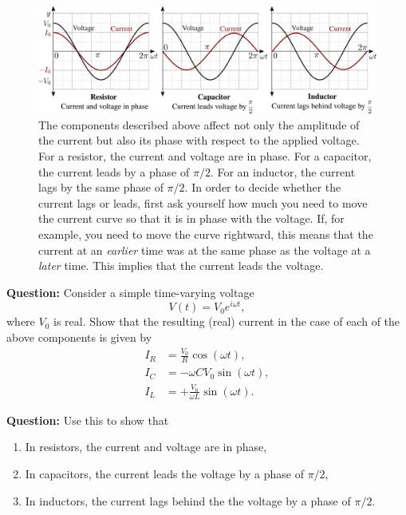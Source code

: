 \begin{figure}[!htb]
    \centering
    \includegraphics[width=\textwidth]{figs/electronics-circuits/electronics-components-phase-graphs.png}
    \caption{The components described above affect not only the amplitude of the current but also its phase with respect to the applied voltage. For a resistor, the current and voltage are in phase. For a capacitor, the current leads by a phase of $\pi/2$. For an inductor, the current lags by the same phase of $\pi/2$. In order to decide whether the current lags or leads, first ask yourself how much you need to move the current curve so that it is in phase with the voltage. If, for example, you need to move the curve rightward, this means that the current at an \textsl{earlier} time was at the same phase as the voltage at a \textsl{later} time. This implies that the current leads the voltage.  }
    \label{fig:phase-graphs}
\end{figure}



\begin{question}
    \textbf{Question:} Consider a simple time-varying voltage 
    \begin{equation}
        V(t) = V_0 e^{i\omega t},
    \end{equation}
    where $V_0$ is real. Show that the resulting (real) current in the case of each of the above components is given by
    \begin{equation}
        \begin{aligned}
            I_R &= \frac{V_0}{R} \cos(\omega t),\\[10pt]
            I_C &= - \omega C V_0 \sin(\omega t),\\[10pt]
            I_L &= + \frac{V_0}{\omega L} \sin(\omega t).
        \end{aligned}
    \end{equation}

    \textbf{Question:} Use this to show that
    \vspace{-\parskip}
    \begin{enumerate}
    \itemsep0em
        \item In resistors, the current and voltage are in phase,
        \item In capacitors, the current leads the voltage by a phase of $\pi/2$,
        \item In inductors, the current lags behind the the voltage by a phase of $\pi/2$.  
    \end{enumerate}
\end{question}

